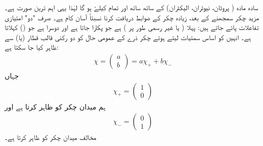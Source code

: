 سادہ مادہ ( پروٹان،  نیوٹران،  الیکٹران)  کے ساتھ ساتھ   اور تمام   کیلۓ    ہو گا  لہٰذا یہی   اہم ترین صورت ہے۔ مزید چکر سمجھنے کے بعد،  زیادہ چکر کے ضوابط  دریافت کرنا نسبتاً   آسان  کام ہے۔  صرف "دو"    امتیازی تفاعلات  پائے جاتے ہیں:  پہلا   ( یا غیر رسمی طور پر  ) ہے جو   پکارا جاتا ہے   اور دوسرا  ہے جو   () کہلاتا ہے۔ انہیں کو  اساس سمتیات لیتے   ہوئے     چکر ذرے  کے عمومی حال کو دو  رکنی  قالب قطار   (یا) سے ظاہر کیا جا سکتا ہے:
\begin{align}\label{مساوات_تین_بعدی_عمومی_حال_چائے}
 \chi=\begin{pmatrix} a \\ b \end{pmatrix}= a\chi_{+} + b\chi_{-} 
 \end{align}
جہاں
\begin{align} 
 \chi_{+}=\begin{pmatrix}1\\0 \end{pmatrix}
 \end{align}
ہم میدان چکر  کو ظاہر کرتا ہے اور  
\begin{align} 
 \chi_{-}=\begin{pmatrix}0 \\1 \end{pmatrix}
 \end{align}
مخالف میدان چکر کو ظاہر کرتا ہے۔

